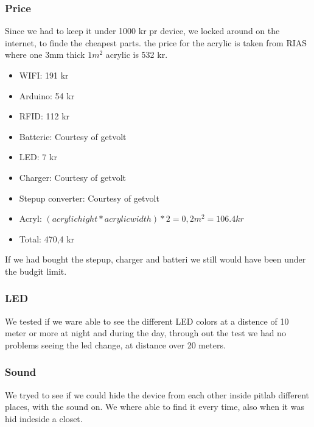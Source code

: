 \subsubsection{Price}
Since we had to keep it under 1000 kr pr device, we locked around on the internet, to finde the cheapest parts.
the price for the acrylic is taken from RIAS \cite{RIAS} where one 3mm thick $1 m^2$ acrylic is 532 kr.
\begin{itemize} \itemsep0em
	 \item WIFI: 191 kr \cite{Adafruit}
	 \item Arduino: 54 kr \cite{Sparkfun}
	 \item RFID: 112 kr \cite{Let-Eletronik}
	 \item Batterie: Courtesy of getvolt  \cite{Getvolt}
	 \item LED: 7 kr \cite{Adafruit}
	 \item Charger: Courtesy of getvolt \cite{Getvolt}
	 \item Stepup converter: Courtesy of getvolt  \cite{Getvolt}
	  \item Acryl: $(acrylic hight * acrylic width)*2 = 0,2 m^2 = 106.4 kr $ \cite{RIAS}
	 \item Total: 470,4 kr
\end{itemize}
If we had bought the stepup, charger and batteri we still would have been under the budgit limit.

\subsubsection{LED}
We tested if we ware able to see the different LED colors at a distence of 10 meter or more at night and during the day, through out the test we had no problems seeing the led change, at distance over 20 meters.

\subsubsection{Sound}
We tryed to see if we could hide the device from each other inside pitlab different places, with the sound on.
We where able to find it every time, also when it was hid indeside a closet.
